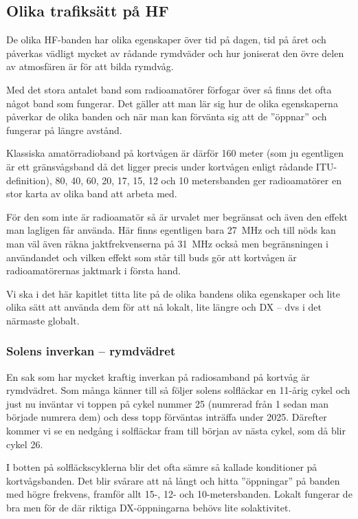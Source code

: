 \clearpage

\subsection{Olika trafiksätt på HF}

De olika HF-banden har olika egenskaper över tid på dagen, tid på året och påverkas vädligt mycket av rådande rymdväder och hur joniserat den övre delen av atmosfären är för att bilda rymdvåg.

Med det stora antalet band som radioamatörer förfogar över så finns det ofta något band som fungerar. Det gäller att man lär sig hur de olika egenskaperna påverkar de olika banden och när man kan förvänta sig att de ''öppnar'' och fungerar på längre avstånd.

Klassiska amatörradioband på kortvågen är därför 160 meter (som ju egentligen är ett gränsvågsband då det ligger precis under kortvågen enligt rådande ITU-definition), 80, 40, 60, 20, 17, 15, 12 och 10 metersbanden ger radioamatörer en stor karta av olika band att arbeta med.

För den som inte är radioamatör så är urvalet mer begränsat och även den effekt man lagligen får använda. Här finns egentligen bara 27~MHz och till nöds kan man väl även räkna jaktfrekvenserna på 31~MHz också men begränsningen i användandet och vilken effekt som står till buds gör att kortvågen är radioamatörernas jaktmark i första hand.

Vi ska i det här kapitlet titta lite på de olika bandens olika egenskaper och lite olika sätt att använda dem för att nå lokalt, lite längre och DX -- dvs i det närmaste globalt.

\subsubsection{Solens inverkan -- rymdvädret}

En sak som har mycket kraftig inverkan på radiosamband på kortvåg är rymdvädret. Som många känner till så följer solens solfläckar en 11-årig cykel och just nu inväntar vi toppen på cykel nummer 25 (numrerad från 1 sedan man började numrera dem) och dess topp förväntas inträffa under 2025. Därefter kommer vi se en nedgång i solfläckar fram till början av nästa cykel, som då blir cykel 26. 

I botten på solfläckscyklerna blir det ofta sämre så kallade konditioner på kortvågsbanden. Det blir svårare att nå långt och hitta ''öppningar'' på banden med högre frekvens, framför allt 15-, 12- och 10-metersbanden. Lokalt fungerar de bra men för de där riktiga DX-öppningarna behövs lite solaktivitet.

